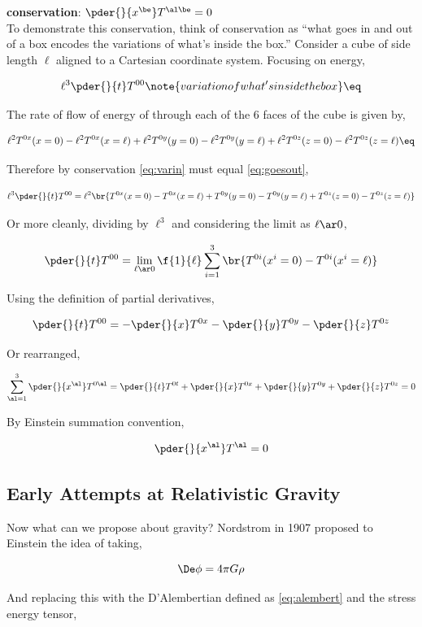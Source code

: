 \documentclass{article}
\begin{document}
\textbf{conservation}: $\pder{}{x^\be} T^{\al\be} = 0$ \\

To demonstrate this conservation, think of conservation as ``what goes in and out of a box encodes the variations of what's inside the box.'' Consider a cube of side length $\ell$ aligned to a Cartesian coordinate system. Focusing on energy,

\[ \ell^3 \pder{}{t} T^{00} \note{variation of what's inside the box} \eq \label{eq:varin} \]

The rate of flow of energy of through each of the 6 faces of the cube is given by,

\[ \ell^2 T^{0x}(x=0) - \ell^2T^{0x}(x=\ell) + \ell^2 T^{0y}(y=0) - \ell^2T^{0y}(y=\ell) + \ell^2 T^{0z}(z=0) - \ell^2T^{0z}(z=\ell) \eq \label{eq:goesout} \]

Therefore by conservation \eqref{eq:varin} must equal \eqref{eq:goesout},

\[ \ell^3 \pder{}{t} T^{00} = \ell^2 \br{T^{0x}(x=0) - T^{0x}(x=\ell) +  T^{0y}(y=0) - T^{0y}(y=\ell) +  T^{0z}(z=0) - T^{0z}(z=\ell)} \]

Or more cleanly, dividing by $\ell^3$ and considering the limit as $\ell \ar 0$,

\[ \pder{}{t} T^{00} = \lim_{\ell \ar 0} \f{1}{\ell} \sum_{i=1}^{3} \br{T^{0i} (x^i = 0) - T^{0i} (x^i = \ell)} \]

Using the definition of partial derivatives,

\[ \pder{}{t} T^{00} = -\pder{}{x}T^{0x}-\pder{}{y}T^{0y}-\pder{}{z}T^{0z} \]

Or rearranged,

\[ \sum_{\al=1}^{3} \pder{}{x^\al}T^{0\al} = \pder{}{t} T^{0t} + \pder{}{x}T^{0x} + \pder{}{y}T^{0y} + \pder{}{z}T^{0z} = 0 \]

By Einstein summation convention,

\[ \pder{}{x^\al}T^{\al} = 0 \]

\subsection{Early Attempts at Relativistic Gravity}

Now what can we propose about gravity? Nordstrom in 1907 proposed to Einstein the idea of taking,

\[ \De \phi = 4 \pi G \rho \]

And replacing this with the D'Alembertian defined as \eqref{eq:alembert} and the stress energy tensor,
\end{document}
